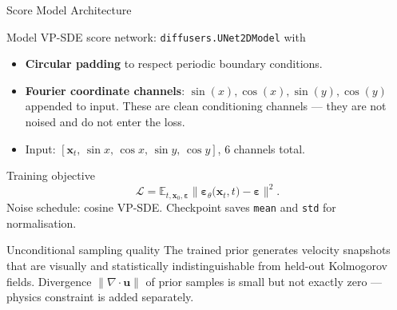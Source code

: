 \documentclass[9pt]{beamer}
\begin{document}
\begin{frame}{Score Model Architecture}
\begin{block}{Model}
VP-SDE score network: \texttt{diffusers.UNet2DModel} with
\begin{itemize}
  \item \textbf{Circular padding} to respect periodic boundary conditions.
  \item \textbf{Fourier coordinate channels}: $\sin(x), \cos(x), \sin(y), \cos(y)$ appended to input.
    These are clean conditioning channels — they are not noised and do not enter the loss.
  \item Input: $[\mathbf{x}_t,\, \sin x,\, \cos x,\, \sin y,\, \cos y]$, 6 channels total.
\end{itemize}
\end{block}
\begin{block}{Training objective}
\[
  \mathcal{L} = \mathbb{E}_{t, \mathbf{x}_0, \boldsymbol{\varepsilon}}
    \bigl\|\boldsymbol{\varepsilon}_\theta\bigl(\mathbf{x}_t, t\bigr) - \boldsymbol{\varepsilon}\bigr\|^2.
\]
Noise schedule: cosine VP-SDE. Checkpoint saves \texttt{mean} and \texttt{std} for normalisation.
\end{block}
\begin{block}{Unconditional sampling quality}
The trained prior generates velocity snapshots that are visually and statistically
indistinguishable from held-out Kolmogorov fields. Divergence $\|\nabla\cdot\mathbf{u}\|$ of
prior samples is small but not exactly zero — physics constraint is added separately.
\end{block}
\end{frame}

\end{document}
